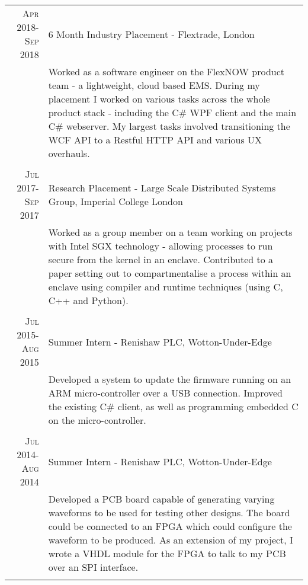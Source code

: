 \documentclass[a4paper,10pt]{article} %
\begin{document}
\begin{tabular}{r|p{14cm}}
\textsc{Apr 2018-Sep 2018} & 6 Month Industry Placement - Flextrade, London  \emph{}\\
& \footnotesize{Worked as a software engineer on the FlexNOW product team - a lightweight, cloud based EMS. During my placement I worked on various tasks across the whole product stack - including the C\# WPF client and the main C\# webserver. My largest tasks involved transitioning the WCF API to a Restful HTTP API and various UX overhauls.}\\
\multicolumn{2}{c}{} \\

\textsc{Jul 2017-Sep 2017} & Research Placement - Large Scale Distributed Systems Group, Imperial College London  \emph{}\\
& \footnotesize{Worked as a group member on a team working on projects with Intel SGX technology - allowing processes to run secure from the kernel in an enclave. Contributed to a paper setting out to compartmentalise a process within an enclave using compiler and runtime techniques (using C, C++ and Python).}\\
\multicolumn{2}{c}{} \\

\textsc{Jul 2015-Aug 2015} & Summer Intern - Renishaw PLC, Wotton-Under-Edge \emph{}\\ 
& \footnotesize{Developed a system to update the firmware running on an ARM micro-controller over a USB connection. Improved the existing C\# client, as well as programming embedded C on the micro-controller.}\\
\multicolumn{2}{c}{} \\


\textsc{Jul 2014-Aug 2014} & Summer Intern - Renishaw PLC, Wotton-Under-Edge \emph{}\\
& \footnotesize{Developed a PCB board capable of generating varying waveforms to be used for testing other designs. The board could be connected to an FPGA which could configure the waveform to be produced. As an extension of my project, I wrote a VHDL module for the FPGA to talk to my PCB over an SPI interface.}\\
\multicolumn{2}{c}{} \\

\end{tabular}
\\
\end{document}
